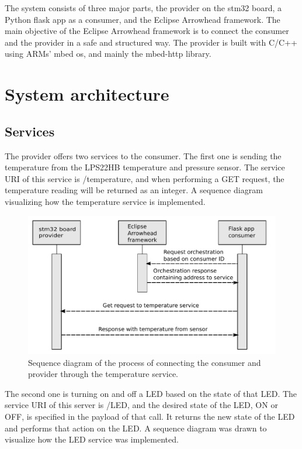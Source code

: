 The system consists of three major parts, the provider on the stm32 board, a Python flask app as a consumer, and the Eclipse Arrowhead framework.
The main objective of the Eclipse Arrowhead framework is to connect the consumer and the provider in a safe and structured way.
The provider is built with C/C++ using ARMs' mbed os, and mainly the mbed-http library. 
\section{System architecture}
\subsection{Services}
The provider offers two services to the consumer. 
The first one is sending the temperature from the LPS22HB temperature and pressure sensor. 
The service URI of this service is /temperature, and when performing a GET request, the temperature reading will be returned as an integer.
A sequence diagram visualizing how the temperature service is implemented.
\begin{figure}[H]
    \centering
    \includegraphics[width=\textwidth]{Pictures/sequence_diagram_consumer.pdf} 
    \caption{Sequence diagram of the process of connecting the consumer and provider through the temperature service.}
    \label{sequence diagram consumer}
\end{figure}
The second one is turning on and off a LED based on the state of that LED.
The service URI of this server is /LED, and the desired state of the LED, ON or OFF, is specified in the payload of that call.
It returns the new state of the LED and performs that action on the LED.
A sequence diagram was drawn to visualize how the LED service was implemented.
